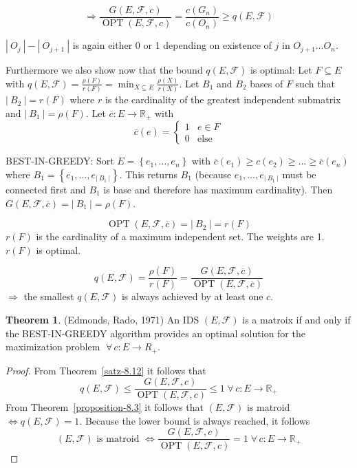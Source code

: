 \documentclass[a4paper]{article}
\theoremstyle{definition}
\newtheorem{theorem}{Theorem}
\newcommand{\card}[1]{\left|\:\!#1\:\!\right|}
\newcommand{\set}[1]{\left\{#1\right\}}
\newcommand{\fall}{\;\forall\,}
\begin{document}
\[
  \Rightarrow
  \frac{G(E, \mathcal{F}, c)}{\operatorname{OPT}(E, \mathcal{F}, c)}
  = \frac{c(G_n)}{c(O_n)}
  \geq q(E, \mathcal{F})
\]

$\card{O_j} - \card{O_{j+1}}$ is again either 0 or 1 depending on existence of $j$ in $O_{j+1} \ldots O_n$.

Furthermore we also show now that the bound $q(E, \mathcal{F})$ is optimal:
Let $F \subseteq E$ with $q(E, \mathcal{F}) = \frac{\rho(F)}{r(F)} = \min_{X \subseteq E} \frac{\rho(X)}{r(X)}$.
Let $B_1$ and $B_2$ bases of $F$ such that $\card{B_2} = r(F)$ where $r$ is the cardinality of the greatest independent submatrix and $\card{B_1} = \rho(F)$.
Let $\overline{c}: E \rightarrow \mathbb{R}_+$ with
\[
  \overline{c}(e) = \begin{cases}
    1 & e \in F \\
    0 & \text{else}
  \end{cases}
\]

BEST-IN-GREEDY: Sort $E = \set{e_1, \ldots, e_n}$ with $\overline{c}(e_1) \geq c(e_2) \geq \ldots \geq \overline{c}(e_n)$ where $B_1 = \set{e_1, \ldots, e_{\card{B_1}}}$. This returns $B_1$ (because $e_1, \ldots, e_{\card{B_1}}$ must be connected first and $B_1$ is base and therefore has maximum cardinality). Then $G(E, \mathcal{F}, \overline{c}) = \card{B_1} = \rho(F)$.

\[ \operatorname{OPT}(E, \mathcal{F}, \overline{c}) = \card{B_2} = r(F) \]
$r(F)$ is the cardinality of a maximum independent set. The weights are 1. $r(F)$ is optimal.

\[ q(E, \mathcal{F}) = \frac{\rho(F)}{r(F)} = \frac{G(E, \mathcal{F}, \overline{c})}{\operatorname{OPT}(E, \mathcal{F}, \overline{c})} \]
$\Rightarrow$ the smallest $q(E, \mathcal{F})$ is always achieved by at least one $c$.

\begin{theorem}
  \label{satz-8.13}
  (Edmonds, Rado, 1971)
  An IDS $(E, \mathcal{F})$ is a matroix if and only if the BEST-IN-GREEDY algorithm provides an optimal solution for the maximization problem $\fall c: E \rightarrow{R}_+$.
\end{theorem}

\begin{proof}
  From Theorem~\ref{satz-8.12} it follows that
  \[
      q(E, \mathcal{F})
        \leq \frac{G(E, \mathcal{F}, c)}{\operatorname{OPT}(E, \mathcal{F}, c)}
        \leq 1  \fall c: E \rightarrow \mathbb{R}_+
  \]
  From Theorem~\ref{proposition-8.3} it follows that $(E, \mathcal{F})$ is matroid $\Leftrightarrow q(E, \mathcal{F}) = 1$. Because the lower bound is always reached, it follows
  \[
    (E, \mathcal{F}) \text{ is matroid }
      \Leftrightarrow
    \frac{G(E, \mathcal{F}, c)}{\operatorname{OPT}(E, \mathcal{F}, c)}
    = 1 \fall c: E \rightarrow \mathbb{R}_+
  \]
\end{proof}
\end{document}
